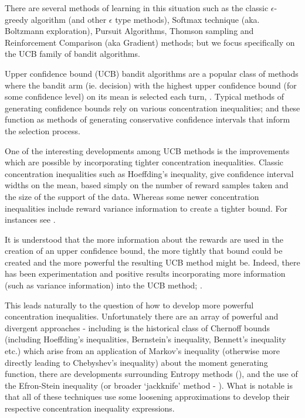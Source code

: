 \documentclass[12pt]{colt2020} %
\begin{document}
There are several methods of learning in this situation such as the classic $\epsilon$-greedy algorithm (and other $\epsilon$ type methods), Softmax technique (aka. Boltzmann exploration), Pursuit Algorithms, Thomson sampling and Reinforcement Comparison (aka Gradient) methods; but we focus specifically on the UCB family of bandit algorithms.

Upper confidence bound (UCB) bandit algorithms are a popular class of methods where the bandit arm (ie. decision) with the highest upper confidence bound (for some confidence level) on its mean is selected each turn, \cite{LAI19854}.
Typical methods of generating confidence bounds rely on various concentration inequalities; and these function as methods of generating conservative confidence intervals that inform the selection process.

One of the interesting developments among UCB methods is the improvements which are possible by incorporating tighter concentration inequalities.
Classic concentration inequalities such as Hoeffding's inequality, give confidence interval widths on the mean, based simply on the number of reward samples taken and the size of the support of the data.
Whereas some newer concentration inequalities include reward variance information to create a tighter bound. For instances see \cite{maurer2009empirical, audibert2009exploration,carpentier2011upper}. %

It is understood that the more information about the rewards are used in the creation of an upper confidence bound, the more tightly that bound could be created and the more powerful the resulting UCB method might be.
Indeed, there has been experimentation and positive results incorporating more information (such as variance information) into the UCB method; \cite{DBLP:conf/aaai/MukherjeeNSR18}.

This leads naturally to the question of how to develop more powerful concentration inequalities.
Unfortunately there are an array of powerful and divergent approaches - including is the historical class of Chernoff bounds (including Hoeffding's inequalities, Bernstein's inequality, Bennett's inequality etc.) which arise from an application of Markov's inequality (otherwise more directly leading to Chebyshev's inequality) about the moment generating function, there are developments surrounding Entropy methods (\cite{article1111333}), and the use of the Efron-Stein inequality (or broader `jackknife' method - \cite{efron1981}).
What is notable is that all of these techniques use some loosening approximations to develop their respective concentration inequality expressions.
\end{document}
